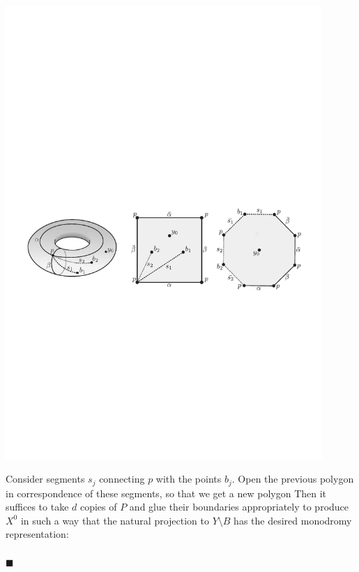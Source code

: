 \documentclass[10pt,handout]{beamer} %
\begin{document}
\begin{frame}
	\vspace{-10pt}
	\includegraphics[width=0.9\textwidth]{../figures/CM-fig-7-6.pdf}
	
	Consider segments $s_j$ connecting $p$ with the points $b_j$. Open the previous polygon in correspondence of these segments, so that we get a new polygon
	Then it suffices to take $d$ copies of $P$ and glue their boundaries appropriately to produce $X^0$ in such a way that the natural projection to $Y\setminus B$ has the desired monodromy representation:\\[-10pt]
	\\[-10pt]
	
	\hfill$\blacksquare$
\end{frame}
\end{document}
